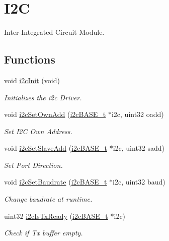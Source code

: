 \hypertarget{group__I2C}{}\section{I2C}
\label{group__I2C}


Inter-\/\+Integrated Circuit Module.  


\subsection*{Functions}
\begin{DoxyCompactItemize}
\item 
void \mbox{\hyperlink{group__I2C_ga1e0a81a1ad1fd7710ca189236e3e5476}{i2c\+Init}} (void)
\begin{DoxyCompactList}\small\item\em Initializes the i2c Driver. \end{DoxyCompactList}\item 
void \mbox{\hyperlink{group__I2C_gac5e773936f2d649255caf6f27d67d131}{i2c\+Set\+Own\+Add}} (\mbox{\hyperlink{reg__i2c_8h_a5d6c119fb20e803a530d0d4df544daf7}{i2c\+B\+A\+S\+E\+\_\+t}} $\ast$i2c, uint32 oadd)
\begin{DoxyCompactList}\small\item\em Set I2C Own Address. \end{DoxyCompactList}\item 
void \mbox{\hyperlink{group__I2C_gadd3ce8bc3e8614df44cfef76f9ce3aba}{i2c\+Set\+Slave\+Add}} (\mbox{\hyperlink{reg__i2c_8h_a5d6c119fb20e803a530d0d4df544daf7}{i2c\+B\+A\+S\+E\+\_\+t}} $\ast$i2c, uint32 sadd)
\begin{DoxyCompactList}\small\item\em Set Port Direction. \end{DoxyCompactList}\item 
void \mbox{\hyperlink{group__I2C_gac5f3d9215b5a06ba464a3f4de4085bb0}{i2c\+Set\+Baudrate}} (\mbox{\hyperlink{reg__i2c_8h_a5d6c119fb20e803a530d0d4df544daf7}{i2c\+B\+A\+S\+E\+\_\+t}} $\ast$i2c, uint32 baud)
\begin{DoxyCompactList}\small\item\em Change baudrate at runtime. \end{DoxyCompactList}\item 
uint32 \mbox{\hyperlink{group__I2C_ga8ae545c7c63f15274a92191efbd81ed4}{i2c\+Is\+Tx\+Ready}} (\mbox{\hyperlink{reg__i2c_8h_a5d6c119fb20e803a530d0d4df544daf7}{i2c\+B\+A\+S\+E\+\_\+t}} $\ast$i2c)
\begin{DoxyCompactList}\small\item\em Check if Tx buffer empty. \end{DoxyCompactList}\item 

\end{DoxyCompactItemize}
